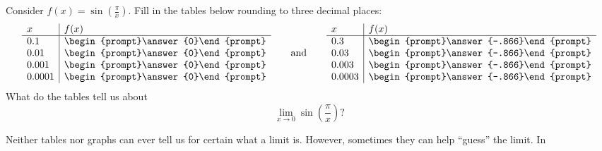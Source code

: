 \documentclass{ximera}
\begin{document}
\begin{question}
  Consider $f(x) = \sin\left(\frac{\pi}{x}\right)$. Fill in the tables
  below rounding to three decimal places:
  \[
  \begin{array}{l|l}
    x      & f(x)      \\ \hline
    0.1    & \begin{prompt}\answer{0}\end{prompt}\\
    0.01   & \begin{prompt}\answer{0}\end{prompt}\\
    0.001  & \begin{prompt}\answer{0}\end{prompt}\\
    0.0001 & \begin{prompt}\answer{0}\end{prompt} 
  \end{array}
  \qquad\text{and}\qquad
  \begin{array}{l|l}
    x      & f(x)            \\ \hline
    0.3    &  \begin{prompt}\answer{-.866}\end{prompt} \\
    0.03   &  \begin{prompt}\answer{-.866}\end{prompt} \\
    0.003  &  \begin{prompt}\answer{-.866}\end{prompt} \\
    0.0003 &  \begin{prompt}\answer{-.866}\end{prompt}
  \end{array}
  \]
  What do the tables tell us about
  \[
  \lim_{x\to 0}\sin\left(\frac{\pi}{x}\right)?
  \]
  \begin{multipleChoice}
  \end{multipleChoice}
  \begin{feedback}
    Neither tables nor graphs can ever tell us for certain what a
    limit is. However, sometimes they can help ``guess'' the limit. In

\end{feedback}
\end{question}
\end{document}
